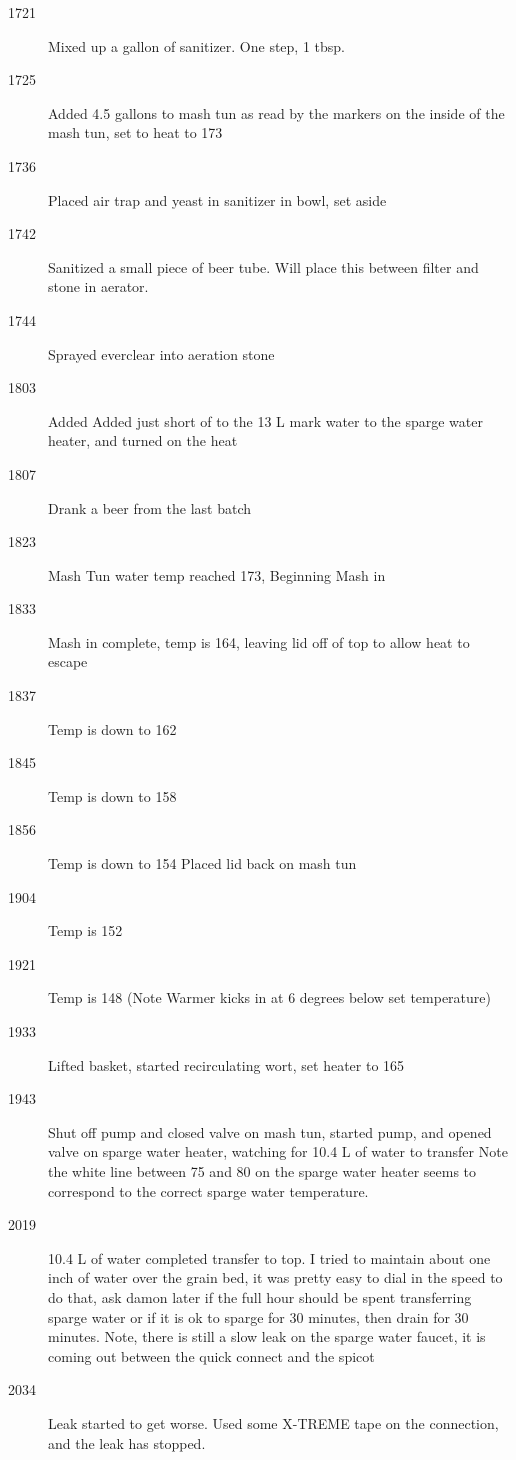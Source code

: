\FloatBarrier{}
\begin{description}
    \item[1721] Mixed up a gallon of sanitizer.  One step, 1 tbsp.
    \item[1725] Added 4.5 gallons to mash tun as read by the markers on the inside of the mash tun, set to heat to 173
    \item[1736] Placed air trap and yeast in sanitizer in bowl, set aside
    \item[1742] Sanitized a small piece of beer tube.  Will place this between filter and stone in aerator.
    \item[1744] Sprayed everclear into aeration stone
    \item[1803] Added Added just short of to the 13 L mark water to the sparge water heater, and turned on the heat
    \item[1807] Drank a beer from the last batch
    \item[1823] Mash Tun water temp reached 173, Beginning Mash in
    \item[1833] Mash in complete, temp is 164, leaving lid off of top to allow heat to escape
    \item[1837] Temp is down to 162
    \item[1845] Temp is down to 158
    \item[1856] Temp is down to 154 Placed lid back on mash tun
    \item[1904] Temp is 152
    \item[1921] Temp is 148 (Note Warmer kicks in at 6 degrees below set temperature)
    \item[1933] Lifted basket, started recirculating wort, set heater to 165
    \item[1943] Shut off pump and closed valve on mash tun, started pump, and opened valve on sparge water heater, watching for 10.4 L of water to transfer  Note the white line between 75 and 80 on the sparge water heater seems to correspond to the correct sparge water temperature.
    \item[2019] 10.4 L of water completed transfer to top.  I tried to maintain about one inch of water over the grain bed, it was pretty easy to dial in the speed to do that, ask damon later if the full hour should be spent transferring sparge water or if it is ok to sparge for 30 minutes, then drain for 30 minutes.  Note, there is still a slow leak on the sparge water faucet, it is coming out between the quick connect and the spicot
    \item[2034] Leak started to get worse.  Used some X-TREME tape on the connection, and the leak has stopped.

\end{description}
